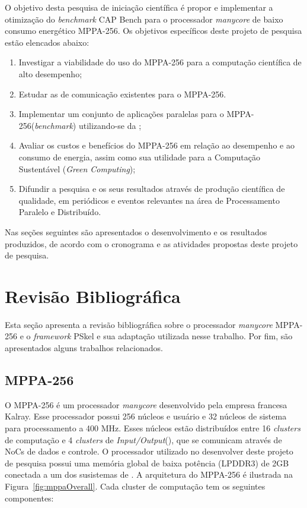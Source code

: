 \documentclass[a4paper,11pt]{article}
\newcommand{\mppa}{MPPA-256\xspace}
\newcommand{\capb}{CAP Bench\xspace}
\newcommand{\manycore}{\textit{manycore}\xspace}
\newcommand{\bench}{\textit{benchmark}\xspace}
\begin{document}
O objetivo desta pesquisa de iniciação científica é propor e implementar a otimização do \bench \capb para o processador \manycore de baixo consumo energético \mppa. Os objetivos específicos deste projeto de pesquisa estão elencados abaixo:

\begin{enumerate}
	\setlength\itemsep{0em}
	\item Investigar a viabilidade do uso do \mppa para a computação científica de alto desempenho;
	\item Estudar as \apis de comunicação existentes para o \mppa.
	\item Implementar um conjunto de aplicações paralelas para o \mppa (\bench) utilizando-se da \api \async;
	\item Avaliar os custos e benefícios do \mppa em relação ao desempenho e ao consumo de energia, assim como sua utilidade para a Computação Sustentável (\textit{Green Computing});
	\item Difundir a pesquisa e os seus resultados através de produção científica de qualidade, em periódicos e eventos relevantes na área de Processamento Paralelo e Distribuído.
\end{enumerate}

Nas seções seguintes são apresentados o desenvolvimento e os resultados produzidos, de acordo com o cronograma e as atividades propostas deste projeto de pesquisa.

\section{Revisão Bibliográfica}

Esta seção apresenta a revisão bibliográfica sobre o processador \textit{manycore} \mppa e o \textit{framework} PSkel e sua adaptação utilizada nesse trabalho. Por fim, são apresentados alguns trabalhos relacionados.

\subsection{MPPA-256}
\label{subsec:mppa}

O \mppa é um processador \textit{manycore} desenvolvido pela empresa francesa
Kalray. Esse processador possui 256 núcleos e usuário e 32 núcleos de sistema para processamento a 400 MHz. Esses núcleos estão distribuídos entre 16 \emph{clusters} de computação e 4 \emph{clusters} de \emph{Input/Output}(\io), que se comunicam através de NoCs de dados e controle. O processador utilizado no desenvolver deste projeto de pesquisa possui uma memória global de baixa potência (LPDDR3) de 2GB conectada a um dos susistemas de \io. A arquitetura do \mppa é ilustrada na Figura~\ref{fig:mppaOverall}. Cada cluster de computação tem os seguintes componentes:
\end{document}
